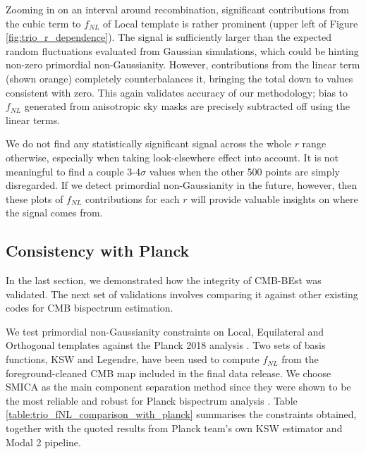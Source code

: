 Zooming in on an interval around recombination, significant contributions from the cubic term to $f_{NL}$ of Local template is rather prominent (upper left of Figure \ref{fig:trio_r_dependence}). The signal is sufficiently larger than the expected random fluctuations evaluated from Gaussian simulations, which could be hinting non-zero primordial non-Gaussianity. However, contributions from the linear term (shown orange) completely counterbalances it, bringing the total down to values consistent with zero. This again validates accuracy of our methodology; bias to $f_{NL}$ generated from anisotropic sky masks are precisely subtracted off using the linear terms.

We do not find any statistically significant signal across the whole $r$ range otherwise, especially when taking look-elsewhere effect into account. It is not meaningful to find a couple 3-4$\sigma$ values when the other 500 points are simply disregarded. If we detect primordial non-Gaussianity in the future, however, then these plots of $f_{NL}$ contributions for each $r$ will provide valuable insights on where the signal comes from.



\subsection{Consistency with Planck} \label{section:consistency_with_Planck}

In the last section, we demonstrated how the integrity of CMB-BEst was validated. The next set of validations involves comparing it against other existing codes for CMB bispectrum estimation.

We test primordial non-Gaussianity constraints on Local, Equilateral and Orthogonal templates against the Planck 2018 analysis \cite{PlanckCollaboration2018}. Two sets of basis functions, KSW and Legendre, have been used to compute $f_{NL}$ from the foreground-cleaned CMB map included in the final data release. We choose SMICA as the main component separation method since they were shown to be the most reliable and robust for Planck bispectrum analysis \cite{PlanckCollaboration2013ComponentSeparation, PlanckCollaboration2013,PlanckCollaboration2015,PlanckCollaboration2018}. Table \ref{table:trio_fNL_comparison_with_planck} summarises the constraints obtained, together with the quoted results from Planck team's own KSW estimator and Modal 2 pipeline.

